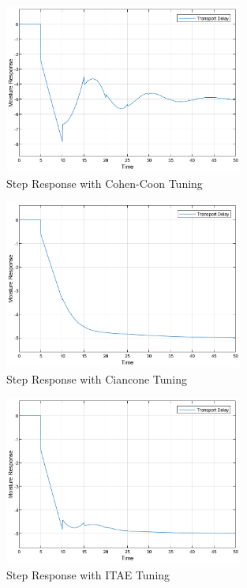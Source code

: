 \documentclass[12pt]{article}
\begin{document}
\begin{enumerate}
\begin{enumerate}
    \begin{figure}[H]
      \centering
      \includegraphics[width=0.7\textwidth]{Figures/figure2-3a.png}
      \caption{Step Response with Cohen-Coon Tuning}
      \label{fig:figure2_3a}
    \end{figure}

    \begin{figure}[H]
      \centering
      \includegraphics[width=0.7\textwidth]{Figures/figure2-3b.png}
      \caption{Step Response with Ciancone Tuning}
      \label{fig:figure2_3b}
    \end{figure}

    \begin{figure}[H]
      \centering
      \includegraphics[width=0.7\textwidth]{Figures/figure2-3c.png}
      \caption{Step Response with ITAE Tuning}
      \label{fig:figure2_3c}
    \end{figure}


\end{enumerate}
\end{enumerate}
\end{document}
